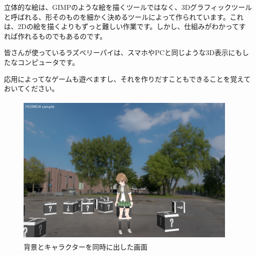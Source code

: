 立体的な絵は、GIMPのような絵を描くツールではなく、3Dグラフィックツールと呼ばれる、形そのものを細かく決めるツールによって作られています。これは、2Dの絵を描くよりもずっと難しい作業です。しかし、仕組みがわかってすれば作れるものでもあるのです。


皆さんが使っているラズベリーパイは、スマホやPCと同じような3D表示にもしたなコンピュータです。

応用によってなゲームも遊べますし、それを作りだすこともできることを覚えておいてください。


\begin{figure}[H]
    \begin{center}
      \includegraphics[keepaspectratio,width=10.834cm,height=7.514cm]{text04-img/s_pronamabox.png}
      \caption{背景とキャラクターを同時に出した画面}
    \end{center}
    \label{fig:prog_menu}
\end{figure}

